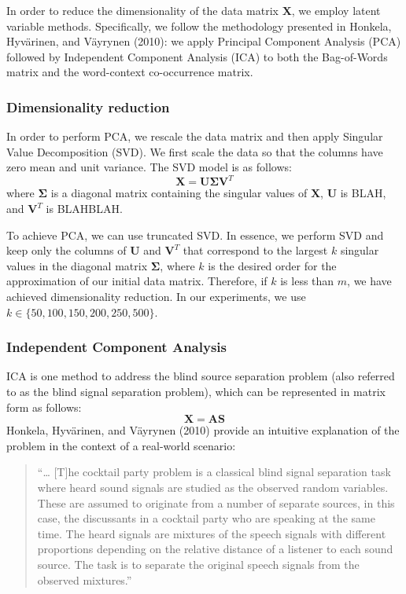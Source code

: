\documentclass{article}
\begin{document}
In order to reduce the dimensionality of the data matrix \(\mathbf{X}\),
we employ latent variable methods. Specifically, we follow the
methodology presented in Honkela, Hyvärinen, and Väyrynen (2010): we
apply Principal Component Analysis (PCA) followed by Independent
Component Analysis (ICA) to both the Bag-of-Words matrix and the
word-context co-occurrence matrix.

\hypertarget{dimensionality-reduction}{%
\subsubsection{Dimensionality
reduction}\label{dimensionality-reduction}}

In order to perform PCA, we rescale the data matrix and then apply
Singular Value Decomposition (SVD). We first scale the data so that the
columns have zero mean and unit variance. The SVD model is as follows:
\[\mathbf{X = U \Sigma V}^T\] where \(\mathbf{\Sigma}\) is a diagonal
matrix containing the singular values of \(\mathbf{X}\), \(\mathbf{U}\)
is BLAH, and \(\mathbf{V}^T\) is BLAHBLAH.

To achieve PCA, we can use truncated SVD. In essence, we perform SVD and
keep only the columns of \(\mathbf{U}\) and \(\mathbf{V}^T\) that
correspond to the largest \(k\) singular values in the diagonal matrix
\(\mathbf{\Sigma}\), where \(k\) is the desired order for the
approximation of our initial data matrix. Therefore, if \(k\) is less
than \(m\), we have achieved dimensionality reduction. In our
experiments, we use \(k \in \{50, 100, 150, 200, 250, 500\}\).

\hypertarget{independent-component-analysis}{%
\subsubsection{Independent Component
Analysis}\label{independent-component-analysis}}

ICA is one method to address the blind source separation problem (also
referred to as the blind signal separation problem), which can be
represented in matrix form as follows: \[\mathbf{X = AS}\] Honkela,
Hyvärinen, and Väyrynen (2010) provide an intuitive explanation of the
problem in the context of a real-world scenario:

\begin{quote}
``\ldots{} {[}T{]}he cocktail party problem is a classical blind signal
separation task where heard sound signals are studied as the observed
random variables. These are assumed to originate from a number of
separate sources, in this case, the discussants in a cocktail party who
are speaking at the same time. The heard signals are mixtures of the
speech signals with different proportions depending on the relative
distance of a listener to each sound source. The task is to separate the
original speech signals from the observed mixtures.''
\end{quote}
\end{document}
